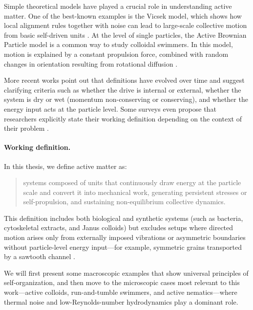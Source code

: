 Simple theoretical models have played a crucial role in understanding active matter. One of the best-known examples is the Vicsek model, which shows how local alignment rules together with noise can lead to large-scale collective motion from basic self-driven units \cite{vicsek1995novel, chate2008collective}. At the level of single particles, the Active Brownian Particle model is a common way to study colloidal swimmers. In this model, motion is explained by a constant propulsion force, combined with random changes in orientation resulting from rotational diffusion \cite{romanczuk2012active, elgeti2015physics}.


More recent works point out that definitions have evolved over time and suggest clarifying criteria such as whether the drive is internal or external, whether the system is dry or wet (momentum non-conserving or conserving), and whether the energy input acts at the particle level. Some surveys even propose that researchers explicitly state their working definition depending on the context of their problem \cite{gompper20202020, gompper20252025}.

\paragraph{Working definition.} In this thesis, we define active matter as:
\begin{quote}
systems composed of units that continuously draw energy at the particle scale and convert it into mechanical work, generating persistent stresses or self-propulsion, and sustaining non-equilibrium collective dynamics.
\end{quote}

This definition includes both biological and synthetic systems (such as bacteria, cytoskeletal extracts, and Janus colloids) but excludes setups where directed motion arises only from externally imposed vibrations or asymmetric boundaries without particle-level energy input—for example, symmetric grains transported by a sawtooth channel \cite{reimann2002brownian, hanggi2009artificial}.



We will first present some macroscopic examples that show universal principles of self-organization, and then move to the microscopic cases most relevant to this work—active colloids, run-and-tumble swimmers, and active nematics—where thermal noise and low-Reynolds-number hydrodynamics play a dominant role.


